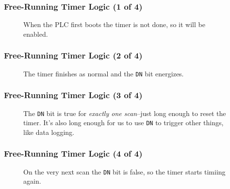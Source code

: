 \begin{frame}
    \frametitle{Free-Running Timer Logic (1 of 4)}

    \begin{figure}
        \centering
        

        \vspace{0.5em}
        {\footnotesize When the PLC first boots the timer is not done, so it will be enabled.\par}
    \end{figure}
\end{frame}

\begin{frame}
    \frametitle{Free-Running Timer Logic (2 of 4)}

    \begin{figure}
        \centering
        

        \vspace{0.5em}
        {\footnotesize The timer finishes as normal and the \texttt{DN} bit energizes.\par}
    \end{figure}
\end{frame}

\begin{frame}
    \frametitle{Free-Running Timer Logic (3 of 4)}

    \begin{figure}
        \centering
        

        \vspace{0.5em}
        {\footnotesize The \texttt{DN} bit is true for \emph{exactly one scan}--just long enough to reset the timer. It's also long enough for us to use \texttt{DN} to trigger other things, like data logging.\par}
    \end{figure}
\end{frame}

\begin{frame}
    \frametitle{Free-Running Timer Logic (4 of 4)}

    \begin{figure}
        \centering
        

        \vspace{0.5em}
        {\footnotesize On the very next scan the \texttt{DN} bit is false, so the timer starts timiing again.\par}
    \end{figure}
\end{frame}

